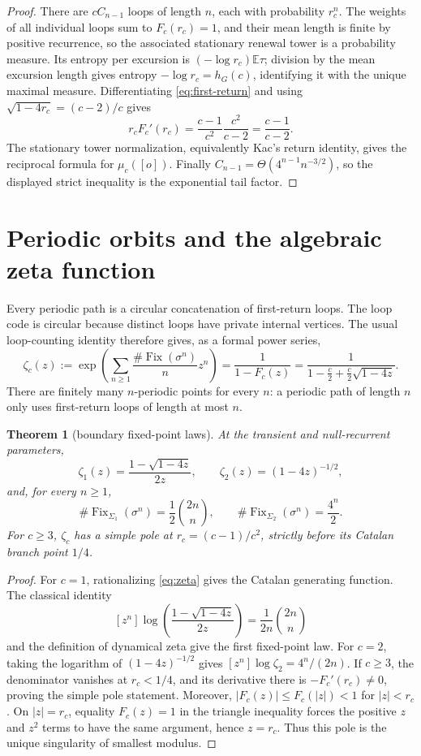 \documentclass[11pt,a4paper]{amsart}
\newtheorem{theorem}{Theorem}[section]
\theoremstyle{definition}
\theoremstyle{remark}
\newcommand{\Fix}{\operatorname{Fix}}
\begin{document}
\begin{proof}
There are $cC_{n-1}$ loops of length $n$, each with probability $r_c^n$.
The weights of all individual loops sum to $F_c(r_c)=1$, and their mean
length is finite by positive recurrence, so the associated stationary
renewal tower is a probability measure.  Its entropy per excursion is
$(-\log r_c)\mathbb E\tau$; division by the mean excursion length gives
entropy $-\log r_c=h_G(c)$, identifying it with the unique maximal measure.
Differentiating \eqref{eq:first-return} and using
$\sqrt{1-4r_c}=(c-2)/c$ gives
\[
 r_cF_c'(r_c)
 =\frac{c-1}{c^2}\frac{c^2}{c-2}
 =\frac{c-1}{c-2}.
\]
The stationary tower normalization, equivalently Kac's return identity,
gives the reciprocal formula for $\mu_c([o])$.  Finally
$C_{n-1}=\Theta(4^{n-1}n^{-3/2})$, so the displayed strict inequality is
the exponential tail factor.
\end{proof}

\section{Periodic orbits and the algebraic zeta function}

Every periodic path is a circular concatenation of first-return loops.  The
loop code is circular because distinct loops have private internal vertices.
The usual loop-counting identity \cite{Keller1991} therefore gives, as a
formal power series,
\begin{equation}\label{eq:zeta}
 \zeta_c(z)
 :=\exp\left(\sum_{n\geq1}\frac{\#\Fix(\sigma^n)}{n}z^n\right)
 =\frac{1}{1-F_c(z)}
 =\frac{1}{1-\frac c2+\frac c2\sqrt{1-4z}}.
\end{equation}
There are finitely many $n$-periodic points for every $n$: a periodic path
of length $n$ only uses first-return loops of length at most $n$.

\begin{theorem}[boundary fixed-point laws]\label{thm:fixed}
At the transient and null-recurrent parameters,
\[
 \zeta_1(z)=\frac{1-\sqrt{1-4z}}{2z},
 \qquad
 \zeta_2(z)=(1-4z)^{-1/2},
\]
and, for every $n\geq1$,
\[
 \#\Fix_{\Sigma_1}(\sigma^n)=\frac12\binom{2n}{n},
 \qquad
 \#\Fix_{\Sigma_2}(\sigma^n)=\frac{4^n}{2}.
\]
For $c\geq3$, $\zeta_c$ has a simple pole at
$r_c=(c-1)/c^2$, strictly before its Catalan branch point $1/4$.
\end{theorem}

\begin{proof}
For $c=1$, rationalizing \eqref{eq:zeta} gives the Catalan generating
function.  The classical identity
\[
 [z^n]\log\!\left(\frac{1-\sqrt{1-4z}}{2z}\right)
 =\frac{1}{2n}\binom{2n}{n}
\]
and the definition of dynamical zeta give the first fixed-point law.  For
$c=2$, taking the logarithm of $(1-4z)^{-1/2}$ gives
$[z^n]\log\zeta_2=4^n/(2n)$.  If $c\geq3$, the denominator vanishes at
$r_c<1/4$, and its derivative there is $-F_c'(r_c)\ne0$, proving the simple
pole statement.  Moreover, $|F_c(z)|\leq F_c(|z|)<1$ for $|z|<r_c$.
On $|z|=r_c$, equality $F_c(z)=1$ in the triangle inequality forces the
positive $z$ and $z^2$ terms to have the same argument, hence $z=r_c$.
Thus this pole is the unique singularity of smallest modulus.
\end{proof}
\end{document}
